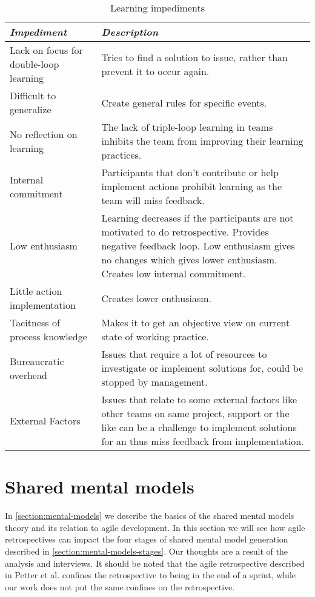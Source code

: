 \begin{table}[h]
	\begin{center}
		\caption{Learning impediments}
		\label{table:learning-impediments}
		\begin{tabular}{p{} p{}}
			\hline
			\textit{Impediment} & \textit{Description} \\
			\hline
			Lack on focus for double-loop learning & Tries to find a solution to issue, rather than prevent it to occur again. \\
			Difficult to generalize & Create general rules for specific events. \\
			No reflection on learning & The lack of triple-loop learning in teams inhibits the team from improving their learning practices. \\
			Internal commitment & Participants that don't contribute or help implement actions prohibit learning as the team will miss feedback. \\ 
			Low enthusiasm & Learning decreases if the participants are not motivated to do retrospective. Provides negative feedback loop. Low enthusiasm gives no changes which gives lower enthusiasm. Creates low internal commitment. \\
			Little action implementation & Creates lower enthusiasm. \\
			Tacitness of process knowledge & Makes it to get an objective view on current state of working practice. \\
			Bureaucratic overhead & Issues that require a lot of resources to investigate or implement solutions for, could be stopped by management. \\
			External Factors & Issues that relate to some external factors like other teams on same project, support or the like can be a challenge to implement solutions for an thus miss feedback from implementation.\\
			\hline
		\end{tabular}
	\end{center}
\end{table}

\clearpage
\section{Shared mental models}
In \autoref{section:mental-models} we describe the basics of the shared mental models theory and its relation to agile development. In this section we will see how agile retrospectives can impact the four stages of shared mental model generation described in \autoref{section:mental-models-stages}. Our thoughts are a result of the analysis and interviews. It should be noted that the agile retrospective described in Petter et al. \cite{Petter2013} confines the retrospective to being in the end of a sprint, while our work does not put the same confines on the retrospective.

